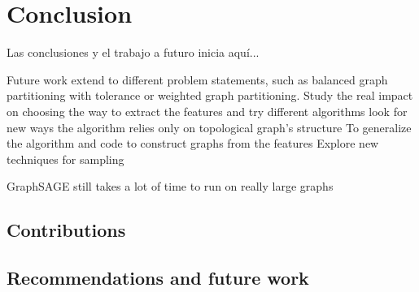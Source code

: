 
\chapter{Conclusion}

Las conclusiones y el trabajo a futuro inicia aqu\'i...

Future work
extend to different problem statements, such as balanced graph partitioning with tolerance or weighted graph partitioning.
Study the real impact on choosing the way to extract the features and try different algorithms
look for new ways the algorithm relies only on topological graph's structure
To generalize the algorithm and code to construct graphs from the features
Explore new techniques for sampling

GraphSAGE still takes a lot of time to run on really large graphs

\section{Contributions}

\section{Recommendations and future work}

\clearpage